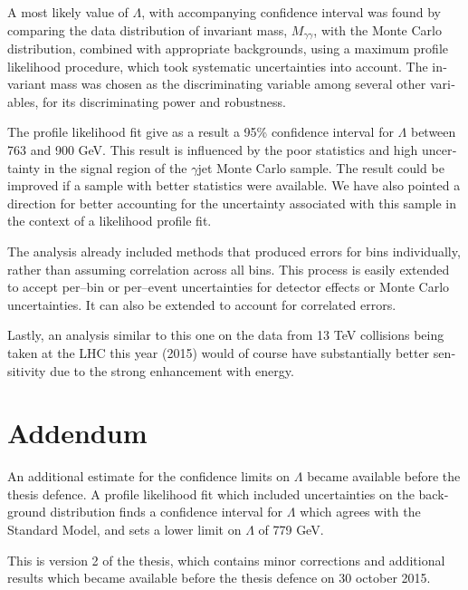 \begin{english}
A most likely value of $\Lambda$, with accompanying confidence interval was found by comparing the data distribution of invariant mass, $M_{\gamma\gamma}$, with the Monte Carlo distribution, combined with appropriate backgrounds, using a maximum profile likelihood procedure, which took systematic uncertainties into account. The invariant mass was chosen as the discriminating variable among several other variables, for its discriminating power and robustness.

The profile likelihood fit give as a result a 95\% confidence interval for $\Lambda$ between 763 and 900 GeV. This result is influenced by the poor statistics and high uncertainty in the signal region of the \atlas{} $\gamma$jet Monte Carlo sample. The result could be improved if a sample with better statistics were available. We have also pointed a direction for better accounting for the uncertainty associated with this sample in the context of a likelihood profile fit.

The analysis already included methods that produced errors for bins individually, rather than assuming correlation across all bins. This process is easily extended to accept per--bin or per--event uncertainties for detector effects or Monte Carlo uncertainties. It can also be extended to account for correlated errors.

Lastly, an analysis similar to this one on the data from 13 TeV collisions being taken at the LHC this year (2015) would of course have substantially better sensitivity due to the strong enhancement with energy.

\section{Addendum}
An additional estimate for the confidence limits on $\Lambda$ became available before the thesis defence. A profile likelihood fit which included uncertainties on the background distribution finds a confidence interval for $\Lambda$ which agrees with the Standard Model, and sets a lower limit on $\Lambda$ of 779 GeV.

\printbibliography[title=References]



\phantom{.}

\thispagestyle{empty}
\vspace{\fill}
\begin{center}
This is version 2 of the thesis, which contains minor corrections and additional results which became available before the thesis defence on 30 october 2015.
\end{center}

\end{english}

